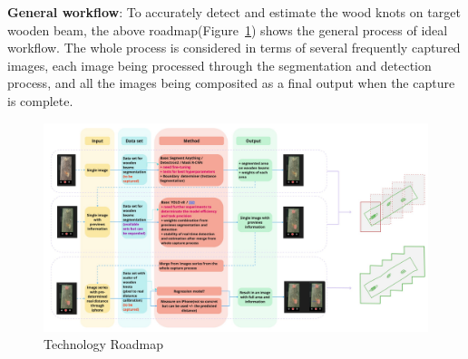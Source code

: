 \renewcommand\thesection{\arabic{section}}
\renewcommand\thesubsection{\thesection.\arabic{subsection}}

\textbf{General workflow}:
To accurately detect and estimate the wood knots on target wooden beam, the above roadmap(Figure~\ref{fig:process}) shows the general process of ideal workflow. The whole process is considered in terms of several frequently captured images, each image being processed through the segmentation and detection process, and all the images being composited as a final output when the capture is complete.

\begin{figure}[ht]
  \centering
   \includegraphics[width=1\textwidth]{Master Thesis/Images/Section_3/3-Process.jpg}
  \caption{Technology Roadmap}   
  \label{fig:process}
\end{figure}  


